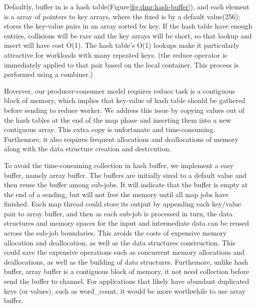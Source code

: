 Defaultly, buffer in \myds is a hash table(Figure\ref{fig:dmr:hash-buffer}), 
and each element is a array of pointers to key arrays,
where the fixed is by a default value(256);
\myds stores the key-value pairs in an array sorted by key.
If the hash table have enough entries, 
collisions will be rare and the key arrays will be short,
so that lookup and insert will have cost O(1).
The hash table's O(1) lookups 
make it particularly attractive for workloads with many repeated keys.
{\color{gray}(the reduce operator is immediately applied
	to that pair based on the local container. This process is
	performed using a combiner.)}


Hoverver, our producer-consumer model requires
reduce task is a contiguous block of memory, 
which implies that key-value of hash table should be gathered
before sending to reduce worker.
We address this issue by 
copying values out of the hash tables
at the end of the map phase and 
inserting them into a new contiguous array.
This extra copy is unfortunate and time-consuming.
Furthemore, it also requires frequent allocations and deallocations of memory 
along with the data structure creation and destrcution.


To avoid the time-consuming collection in hash buffer, 
we implement a easy buffer, namely array buffer.
The buffers are initially sized to a default value and 
then reuse the buffer among sub-jobs.
It will indicate that the buffer is empty at the end of a sending, 
but will not free the memory until all map jobs have finished.
Each map thread could store its output 
by appending each key/value pair to array buffer, 
and then as each sub-job is processed in turn,
the data structures and memory spaces 
for the input and intermediate data can be reused across the sub-job boundaries. 
This avoids the costs of expensive memory allocation and deallocation, 
as well as the data structures construction.
This could save the expensive operations 
such as concurrent memory allocations and deallocations,
as well as the building of data structures.
Furthemore, unlike hash buffer, array buffer is a contiguous block of memory,
it not need collection before send the buffer to channel.
For applications that likely have abundant duplicated keys (or values),
such as word\_count, it would be more worthwhile to use array buffer.

